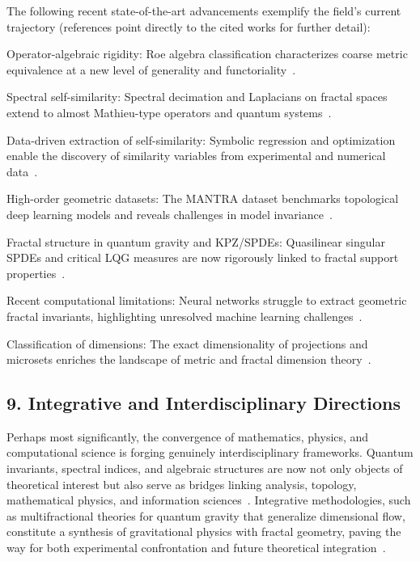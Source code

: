 \documentclass[sigconf]{acmart}
\begin{document}
The following recent state-of-the-art advancements exemplify the field's current trajectory (references point directly to the cited works for further detail):

Operator-algebraic rigidity: Roe algebra classification characterizes coarse metric equivalence at a new level of generality and functoriality~\cite{ref52}.

Spectral self-similarity: Spectral decimation and Laplacians on fractal spaces extend to almost Mathieu-type operators and quantum systems~\cite{ref54}.

Data-driven extraction of self-similarity: Symbolic regression and optimization enable the discovery of similarity variables from experimental and numerical data~\cite{ref65}.

High-order geometric datasets: The MANTRA dataset benchmarks topological deep learning models and reveals challenges in model invariance~\cite{ref26}.

Fractal structure in quantum gravity and KPZ/SPDEs: Quasilinear singular SPDEs and critical LQG measures are now rigorously linked to fractal support properties~\cite{ref94,ref81}.

Recent computational limitations: Neural networks struggle to extract geometric fractal invariants, highlighting unresolved machine learning challenges~\cite{ref44,ref26}.

Classification of dimensions: The exact dimensionality of projections and microsets enriches the landscape of metric and fractal dimension theory~\cite{ref69,ref72}.

\subsection*{9. Integrative and Interdisciplinary Directions}

Perhaps most significantly, the convergence of mathematics, physics, and computational science is forging genuinely interdisciplinary frameworks. Quantum invariants, spectral indices, and algebraic structures are now not only objects of theoretical interest but also serve as bridges linking analysis, topology, mathematical physics, and information sciences~\cite{ref65,ref92}. Integrative methodologies, such as multifractional theories for quantum gravity that generalize dimensional flow, constitute a synthesis of gravitational physics with fractal geometry, paving the way for both experimental confrontation and future theoretical integration~\cite{ref6}.
\end{document}
